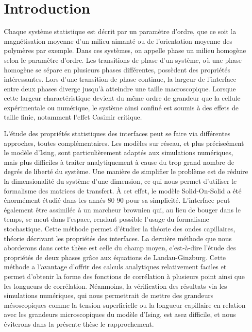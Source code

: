 \chapter*{Introduction}


Chaque système statistique est décrit par un paramètre d'ordre, que ce soit la magnétisation moyenne d'un milieu aimanté ou de l'orientation moyenne des polymères par exemple. Dans ces systèmes, on appelle phase un milieu homogène selon le paramètre d'ordre. Les transitions de phase d'un système, où une phase homogène se sépare en plusieurs phases différentes, possèdent des propriétés intéressantes. Lors d'une transition de phase continue, la largeur de l'interface entre deux phases diverge jusqu'à atteindre une taille macroscopique. Lorsque cette largeur charactéristique devient du même ordre de grandeur que la cellule expérimentale ou numérique, le système ainsi confiné est soumis à des effets de taille finie, notamment l'effet Casimir critique.

L'étude des propriétés statistiques des interfaces peut se faire via différentes approches, toutes complémentaires. Les modèles sur réseau, et plus préciseément le modèle d'Ising, sont particulièrement adaptés aux simulations numériques, mais plus difficiles à traiter analytiquement à cause du trop grand nombre de degrés de liberté du système. Une manière de simplifier le problème est de réduire la dimensionalité du système d'une dimension, ce qui nous permet d'utiliser le formalisme des matrices de transfert. À cet effet, le modèle Solid-On-Solid a été énormément étudié dans les annés 80-90 pour sa simplicité. L'interface peut également être assimilée à un marcheur brownien qui, au lieu de bouger dans le temps, se meut dans l'espace, rendant possible l'usage du formalisme stochastique. Cette méthode permet d'étudier la théorie des ondes capillaires, théorie décrivant les propriétés des interfaces. 
La dernière méthode que nous aborderons dans cette thèse est celle du champ moyen, c'est-à-dire l'étude des propriétés de deux phases grâce aux équations de Landau-Ginzburg. Cette méthode a l'avantage d'offrir des calculs analytiques relativement faciles et permet d'obtenir la forme des fonctions de corrélation à plusieurs point ainsi que les longueurs de corrélation. Néanmoins, la vérification des résultats via les simulations numériques, qui nous permettrait de mettre des grandeurs mésoscopiques comme la tension superficielle ou la longueur capillaire en relation avec les grandeurs microscopiques du modèle d'Ising, est asez difficile, et nous éviterons dans la présente thèse le rapprochement.

